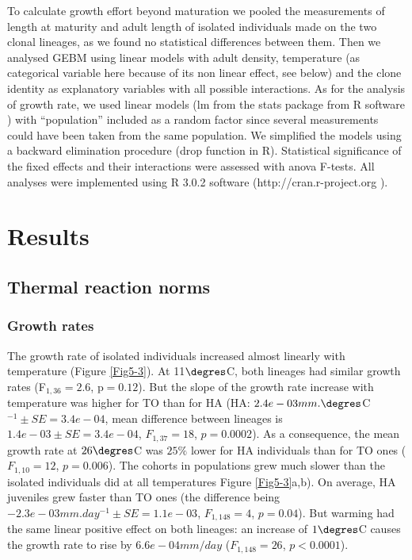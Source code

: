 To calculate growth effort beyond maturation we pooled the measurements of
length at maturity and adult length of isolated individuals made on the two
clonal lineages, as we found no statistical differences between them. Then we
analysed GEBM using linear models with adult density, temperature (as
categorical variable here because of its non linear effect, see below) and the
clone identity as explanatory variables with all possible interactions. As for
the analysis of growth rate, we used linear models (lm from the stats package
from R software \autocites{pinheiro2000a}) with ``population'' included as a
random factor since several measurements could have been taken from the same population. We
simplified the models using a backward elimination procedure (drop function in
R). Statistical significance of the fixed effects and their interactions were
assessed with anova F-tests. All analyses were implemented using R 3.0.2
software (http://cran.r-project.org \autocites{ihaka1996a}).


\section{Results}

\subsection{Thermal reaction norms}

\subsubsection{Growth rates}

The growth rate of isolated individuals increased almost linearly with
temperature (Figure \ref{Fig5-3}). At 11$\degres$C, both lineages had similar
growth rates (F$_{1,36}=2.6$, p$=0.12$). But the slope of the growth rate
increase with temperature was higher for TO than for HA (HA: $2.4e-03
mm.\degres$C$^{-1} \pm SE = 3.4e-04$, mean difference between lineages is
$1.4e-03 \pm SE = 3.4e-04$, $F_{1,37} = 18$, $p = 0.0002$). As a consequence,
the mean growth rate at $26\degres$C was $25\%$ lower for HA individuals than
for TO ones ($F_{1,10} = 12$, $p = 0.006$). The cohorts in populations grew much
slower than the isolated individuals did at all temperatures Figure \ref{Fig5-3}a,b). On
average, HA juveniles grew faster than TO ones (the difference being $-2.3e-03
mm.day^{-1} \pm SE = 1.1e-03$, $F_{1,148}=4$, $p=0.04$). But warming had the
same linear positive effect on both lineages: an increase of $1\degres$C causes
the growth rate to rise by $6.6e-04 mm/day$ ($F_{1,148}=26$, $p<0.0001$).

